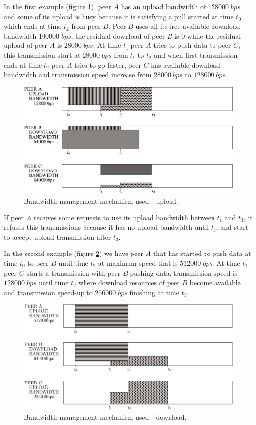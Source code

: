 In the first example (figure \ref{max-min-fairness-upload}), peer $A$ has an upload bandwidth of $128000\;bps$ and some of its upload is busy because it is satisfying a pull started at time $t_0$ which ends at time $t_2$ from peer $B$. Peer $B$ uses all its free available download bandwidth $100000\;bps$, the residual download of peer $B$ is $0$ while the residual upload of peer $A$ is $28000\;bps$. At time $t_{1}$ peer $A$ tries to push data to peer $C$, this transmission start at $28000\;bps$ from $t_{1}$ to $t_{2}$ and when first transmission ends at time $t_{2}$ peer $A$ tries to go faster, peer $C$ has available download bandwidth and transmission speed increase from $28000\;bps$ to $128000\;bps$.
\begin{figure}[ht]
\centering
\includegraphics[width=\textwidth]{img/max-min-fairness-upload.eps}
\caption{Bandwidth management mechanism used - upload.}
\label{max-min-fairness-upload}
\end{figure}

If peer $A$ receives some requests to use its upload bandwidth between $t_{1}$ and $t_{3}$, it refuses this transmissions because it has no upload bandwidth until $t_{3}$, and start to accept upload transmission after $t_{3}$.

In the second example (figure \ref{max-min-fairness-download}) we have peer $A$ that has started to push data at time $t_{0}$ to peer $B$ until time $t_{2}$ at maximum speed that is $512000\;bps$. At time $t_{1}$ peer $C$ starts a transmission with peer $B$ pushing data, transmission speed is $128000\;bps$ until time $t_{2}$ where download resources of peer $B$ become available and transmission speed-up to $256000\;bps$ finishing at time $t_{3}$.
\begin{figure}[ht]
\centering
\includegraphics[width=\textwidth]{img/max-min-fairness-download.eps}
\caption{Bandwidth management mechanism used - download.}
\label{max-min-fairness-download}
\end{figure}

